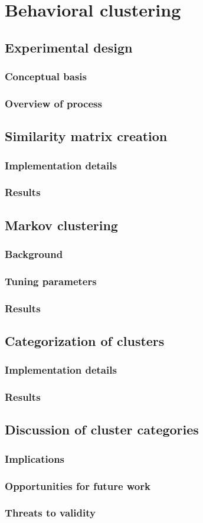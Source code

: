 \chapter{Behavioral clustering}
\section{Experimental design}
\subsection{Conceptual basis}
\subsection{Overview of process}

\section{Similarity matrix creation}

\subsection{Implementation details}
\subsection{Results}

\section{Markov clustering}
\subsection{Background}
\subsection{Tuning parameters}
\subsection{Results}

\section{Categorization of clusters}
\subsection{Implementation details}
\subsection{Results}

\section{Discussion of cluster categories}
\subsection{Implications}
\subsection{Opportunities for future work}
\subsection{Threats to validity}
